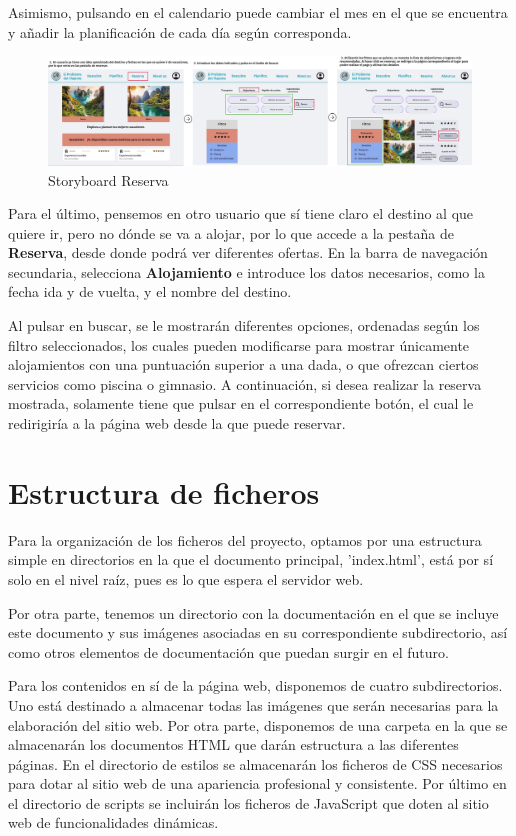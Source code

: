 \documentclass[11pt, a4paper]{book}
\begin{document}
	Asimismo, pulsando en el calendario puede cambiar el mes en el que se encuentra y añadir la planificación de cada día según corresponda.
	
	\begin{figure} [H]
		\centering
		\includegraphics[width=\textwidth]{storyboard-reservar.png}
		\caption{Storyboard Reserva}
	\end{figure}

	Para el último, pensemos en otro usuario que sí tiene claro el destino al que quiere ir, pero no dónde se va a alojar, por lo que accede a la pestaña de \textbf{Reserva}, desde donde podrá ver diferentes ofertas. En la barra de navegación secundaria, selecciona \textbf{Alojamiento} e introduce los datos necesarios, como la fecha ida y de vuelta, y el nombre del destino.
	
	Al pulsar en buscar, se le mostrarán diferentes opciones, ordenadas según los filtro seleccionados, los cuales pueden modificarse para mostrar únicamente alojamientos con una puntuación superior a una dada, o que ofrezcan ciertos servicios como piscina o gimnasio. A continuación, si desea realizar la reserva mostrada, solamente tiene que pulsar en el correspondiente botón, el cual le redirigiría a la página web desde la que puede reservar.


	
	
	
	\section{Estructura de ficheros}
	\label{ficheros}
	Para la organización de los ficheros del proyecto, optamos por una estructura simple en directorios en la que el documento principal, 'index.html', está por sí solo en el nivel raíz, pues es lo que espera el servidor web. 
	
	Por otra parte, tenemos un directorio con la documentación en el que se incluye este documento y sus imágenes asociadas en su correspondiente subdirectorio, así como otros elementos de documentación que puedan surgir en el futuro.
	
	Para los contenidos en sí de la página web, disponemos de cuatro subdirectorios. Uno está destinado a almacenar todas las imágenes que serán necesarias para la elaboración del sitio web. Por otra parte, disponemos de una carpeta en la que se almacenarán los documentos HTML que darán estructura a las diferentes páginas. En el directorio de estilos se almacenarán los ficheros de CSS necesarios para dotar al sitio web de una apariencia profesional y consistente. Por último en el directorio de scripts se incluirán los ficheros de JavaScript que doten al sitio web de funcionalidades dinámicas. 
	
\end{document}
